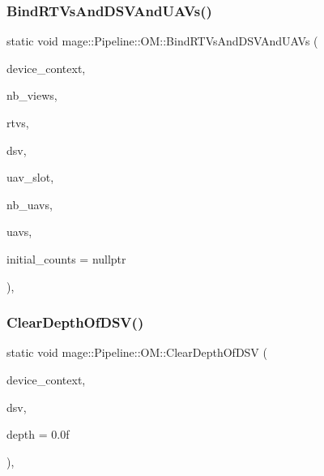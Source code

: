 \subsubsection{\texorpdfstring{Bind\+R\+T\+Vs\+And\+D\+S\+V\+And\+U\+A\+Vs()}{BindRTVsAndDSVAndUAVs()}}
{\footnotesize\ttfamily static void mage\+::\+Pipeline\+::\+O\+M\+::\+Bind\+R\+T\+Vs\+And\+D\+S\+V\+And\+U\+A\+Vs (\begin{DoxyParamCaption}\item[{I\+D3\+D11\+Device\+Context4 $\ast$}]{device\+\_\+context,  }\item[{\hyperlink{namespacemage_a41c104c036fba3756a74e19f793eeaa1}{U32}}]{nb\+\_\+views,  }\item[{I\+D3\+D11\+Render\+Target\+View $\ast$const $\ast$}]{rtvs,  }\item[{I\+D3\+D11\+Depth\+Stencil\+View $\ast$}]{dsv,  }\item[{\hyperlink{namespacemage_a41c104c036fba3756a74e19f793eeaa1}{U32}}]{uav\+\_\+slot,  }\item[{\hyperlink{namespacemage_a41c104c036fba3756a74e19f793eeaa1}{U32}}]{nb\+\_\+uavs,  }\item[{I\+D3\+D11\+Unordered\+Access\+View $\ast$const $\ast$}]{uavs,  }\item[{const \hyperlink{namespacemage_a41c104c036fba3756a74e19f793eeaa1}{U32} $\ast$}]{initial\+\_\+counts = {\ttfamily nullptr} }\end{DoxyParamCaption})\hspace{0.3cm}{\ttfamily [static]}, {\ttfamily [noexcept]}}

\hypertarget{structmage_1_1_pipeline_1_1_o_m_a682ce6380807218da4042475e983b6d7}{}\label{structmage_1_1_pipeline_1_1_o_m_a682ce6380807218da4042475e983b6d7} 
\subsubsection{\texorpdfstring{Clear\+Depth\+Of\+D\+S\+V()}{ClearDepthOfDSV()}}
{\footnotesize\ttfamily static void mage\+::\+Pipeline\+::\+O\+M\+::\+Clear\+Depth\+Of\+D\+SV (\begin{DoxyParamCaption}\item[{I\+D3\+D11\+Device\+Context4 $\ast$}]{device\+\_\+context,  }\item[{I\+D3\+D11\+Depth\+Stencil\+View $\ast$}]{dsv,  }\item[{\hyperlink{namespacemage_aa97e833b45f06d60a0a9c4fc22ae02c0}{F32}}]{depth = {\ttfamily 0.0f} }\end{DoxyParamCaption})\hspace{0.3cm}{\ttfamily [static]}, {\ttfamily [noexcept]}}

